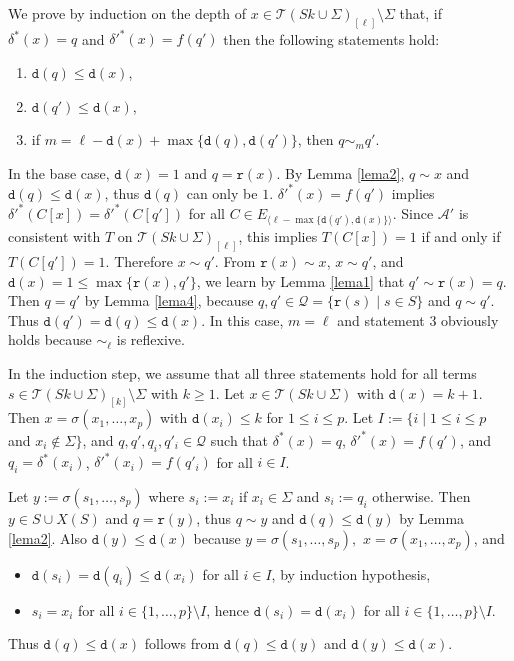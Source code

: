 \documentclass[preprint,12pt,english]{article}
\def\tr{\mathtt{r}}
\def\cA{\mathcal{A}}
\def\cT{\mathcal{T}}
\def\cQ{\mathcal{Q}}
\def\depth{\mathtt{d}}
\newcommand\pair[1]{\langle{#1}\rangle}
\begin{document}
We prove by induction on the depth of $x\in\cT(Sk\cup\Sigma)_{[\ell]}\setminus\Sigma$ that, if $\delta^*(x)=q$ and $\delta'^*(x)=f(q')$ then the following statements hold:
\begin{enumerate}
\item $\depth(q)\leq\depth(x)$,
\item  $\depth(q')\leq \depth(x)$,
\item if $m=\ell-\depth(x)+\max\{\depth(q),\depth(q')\}$, then $q\sim_m q'$.
\end{enumerate}
In the base case, $\depth(x)=1$
and $q=\tr(x)$. By Lemma \ref{lema2}, $q\sim x$ and $\depth(q)\leq \depth(x)$, thus $\depth(q)$ can only be $1$. $\delta'^*(x)=f(q')$ implies $\delta'^*(C[x])=\delta'^*(C[q'])$ for all $C\in E_{\pair{\ell-\max\{\depth(q'),\depth(x)\}}}$. Since $\cA'$ is consistent with $T$ on $\cT(Sk\cup\Sigma)_{[\ell]}$, this implies  $T(C[x])=1$ if and only if $T(C[q'])=1.$ Therefore  $x\sim q'$. From  $\tr(x)\sim x$, $x\sim q'$, and $\depth(x)=1\leq\max\{\tr(x),q'\}$, we learn by Lemma \ref{lema1} that $q'\sim \tr(x)=q.$  
Then $q=q'$ by Lemma \ref{lema4}, because $q,q'\in \cQ=\{\tr(s)\mid s\in S\}$ and $q\sim q'$. Thus $\depth(q')= \depth(q)\leq\depth(x).$ In this case, $m=\ell$ and statement 3 obviously holds because $\sim_\ell$
is reflexive.

In the induction step, we assume that all three statements hold for all terms $s\in \cT(Sk\cup\Sigma)_{[k]}\setminus\Sigma$ with $k\geq 1$. Let $x\in \cT(Sk\cup\Sigma)$ with $\depth(x)=k+1.$ Then $x=\sigma(x_1,\ldots,x_p)$ with $\depth(x_i)\leq k$ for $1\leq i\leq p.$ Let $I:=\{i\mid 1\leq i\leq p$ and $x_i\not\in\Sigma\}$,  and $q,q',q_i,q'_i\in\cQ$ such that $\delta^*(x)=q$,  $\delta'^*(x)=f(q')$, and $q_i=\delta^*(x_i)$, $\delta'^*(x_i)=f(q'_i)$ for all $i\in I$.

Let $y:=\sigma(s_1,\ldots,s_p)$ where $s_i:=x_i$ if $x_i\in \Sigma$ and $s_i:=q_i$ otherwise. Then $y\in S\cup X(S)$ and $q=\tr(y)$, thus $q\sim y$ and $\depth(q)\leq\depth(y)$ by Lemma \ref{lema2}. Also $\depth(y)\leq \depth(x)$ because $y=\sigma(s_1,\ldots,s_p),$ $x=\sigma(x_1,\ldots,x_p)$, and
\begin{itemize}
\item $\depth(s_i)=\depth(q_i)\leq \depth(x_i)$ for all $i\in I$, by induction hypothesis, 
\item $s_i=x_i$ for all $i\in\{1,\ldots,p\}\setminus I$, hence $\depth(s_i)=\depth(x_i)$ for all $i\in\{1,\ldots,p\}\setminus I$.
\end{itemize}
Thus $\depth(q)\leq\depth(x)$ follows from  $\depth(q)\leq\depth(y)$ and $\depth(y)\leq\depth(x).$
\end{document}
